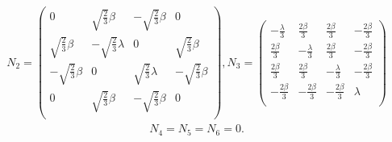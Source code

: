 \begin{align}
N_2 = \left(
\begin{array}{cccc}
 0 & \sqrt{\frac{2}{3}} \beta & -\sqrt{\frac{2}{3}} \beta & 0 \\
 \sqrt{\frac{2}{3}} \beta & -\sqrt{\frac{2}{3}} \lambda & 0 & \sqrt{\frac{2}{3}} \beta \\
 -\sqrt{\frac{2}{3}} \beta & 0 & \sqrt{\frac{2}{3}}  \lambda & -\sqrt{\frac{2}{3}} \beta \\
 0 & \sqrt{\frac{2}{3}} \beta & -\sqrt{\frac{2}{3}} \beta & 0 \\
\end{array}
\right),
 N_3 = \left(
\begin{array}{cccc}
 -\frac{\lambda}{3} & \frac{2 \beta}{3} & \frac{2 \beta}{3} & -\frac{2 \beta}{3} \\
 \frac{2 \beta}{3} & -\frac{\lambda}{3} & \frac{2 \beta}{3} & -\frac{2 \beta}{3} \\
 \frac{2 \beta}{3} & \frac{2 \beta}{3} & -\frac{\lambda}{3} & -\frac{2 \beta}{3} \\
 -\frac{2 \beta}{3} & -\frac{2 \beta}{3} & -\frac{2 \beta}{3} & \lambda \\
\end{array}
\right)
\end{align}
\renewcommand{\arraystretch}{1}
\begin{align}
N_4 = N_5 = N_6 = 0.
\end{align}